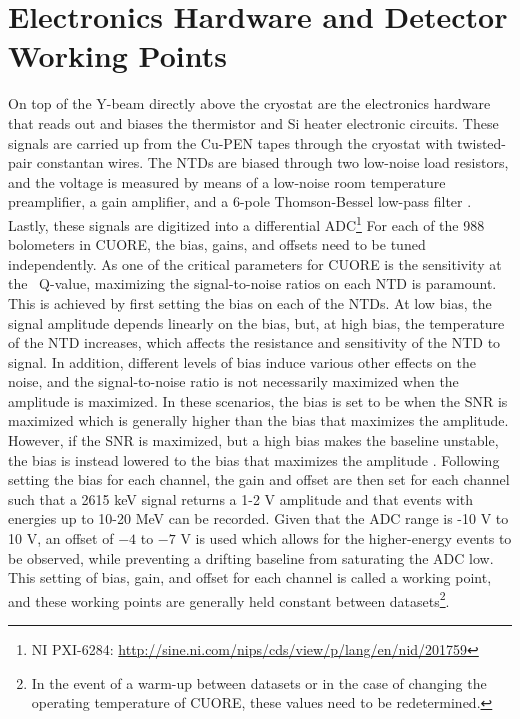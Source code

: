 \section{Electronics Hardware and Detector Working Points}
\label{sec:Electronics Hardware}
On top of the Y-beam directly above the cryostat are the electronics hardware that reads out and biases the thermistor and Si heater electronic circuits.
These signals are carried up from the Cu-PEN tapes through the cryostat with twisted-pair constantan wires.
The NTDs are biased through two low-noise load resistors, and the voltage is measured by means of a low-noise room temperature preamplifier, a gain amplifier, and a 6-pole Thomson-Bessel low-pass filter \cite{doi:10.1063/1.4936269, PESSINA2000132, ARNABOLDI2010327}.
Lastly, these signals are digitized into a differential ADC\footnote{\RaggedRight NI PXI-6284: \url{http://sine.ni.com/nips/cds/view/p/lang/en/nid/201759}}
For each of the 988 bolometers in CUORE, the bias, gains, and offsets need to be tuned independently.
As one of the critical parameters for CUORE is the sensitivity at the \zeronubb~Q-value, maximizing the signal-to-noise ratios on each NTD is paramount.
This is achieved by first setting the bias on each of the NTDs.
At low bias, the signal amplitude depends linearly on the bias, but, at high bias, the temperature of the NTD increases, which affects the resistance and sensitivity of the NTD to signal.
In addition, different levels of bias induce various other effects on the noise, and the signal-to-noise ratio is not necessarily maximized when the amplitude is maximized.
In these scenarios, the bias is set to be when the SNR is maximized which is generally higher than the bias that maximizes the amplitude.
However, if the SNR is maximized, but a high bias makes the baseline unstable, the bias is instead lowered to the bias that maximizes the amplitude \cite{Lucia:LoadCurvesDoc}.
Following setting the bias for each channel, the gain and offset are then set for each channel such that a 2615 keV signal returns a 1-2 V amplitude and that events with energies up to 10-20 MeV can be recorded.
Given that the ADC range is -10 V to 10 V, an offset of $-4$ to $-7$ V is used which allows for the higher-energy events to be observed, while preventing a drifting baseline from saturating the ADC low.
This setting of bias, gain, and offset for each channel is called a working point, and these working points are generally held constant between datasets\footnote{In the event of a warm-up between datasets or in the case of changing the operating temperature of CUORE, these values need to be redetermined.}.

